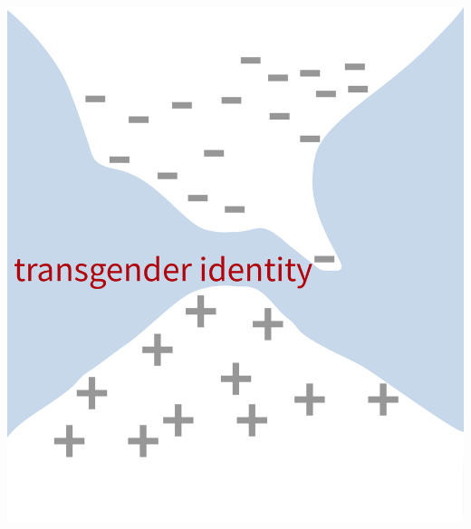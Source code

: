 \documentclass[presentation]{subfiles}
\begin{document}
\begin{frame}
\begin{columns}
\begin{column}{0.48\textwidth}
{    \includegraphics[width=\textwidth]{figures/sketches/gender.pdf}
  
  }

  \end{column}
  \end{columns}

\end{frame}
\end{document}
